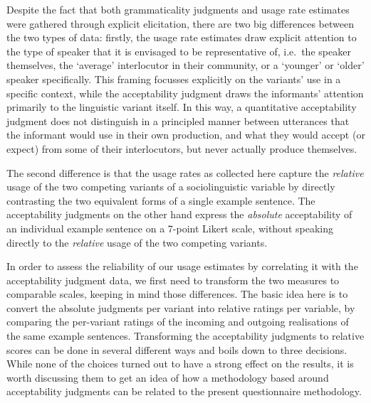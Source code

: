 Despite the fact that both grammaticality judgments and usage rate estimates were gathered through explicit elicitation, there are two big differences between the two types of data: firstly, the usage rate estimates draw explicit attention to the type of speaker that it is envisaged to be representative of, i.e.~the speaker themselves, the `average' interlocutor in their community, or a `younger' or `older' speaker specifically. This framing focusses explicitly on the variants' use in a specific context, while the acceptability judgment draws the informants' attention primarily to the linguistic variant itself.
In this way, a quantitative acceptability judgment does not distinguish in a principled manner between utterances that the informant would use in their own production, and what they would accept (or expect) from some of their interlocutors, but never actually produce themselves.

The second difference is that the usage rates as collected here capture the \emph{relative} usage of the two competing variants of a sociolinguistic variable by directly contrasting the two equivalent forms of a single example sentence. The acceptability judgments on the other hand express the \emph{absolute} acceptability of an individual example sentence on a 7-point Likert scale, without speaking directly to the \emph{relative} usage of the two competing variants.

In order to assess the reliability of our usage estimates by correlating it with the acceptability judgment data, we first need to transform the two measures to comparable scales, keeping in mind those differences. The basic idea here is to convert the absolute judgments per variant into relative ratings per variable, by comparing the per-variant ratings of the incoming and outgoing realisations of the same example sentences. Transforming the acceptability judgments to relative scores can be done in several different ways and boils down to three decisions. While none of the choices turned out to have a strong effect on the results, it is worth discussing them to get an idea of how a methodology based around acceptability judgments can be related to the present questionnaire methodology.


